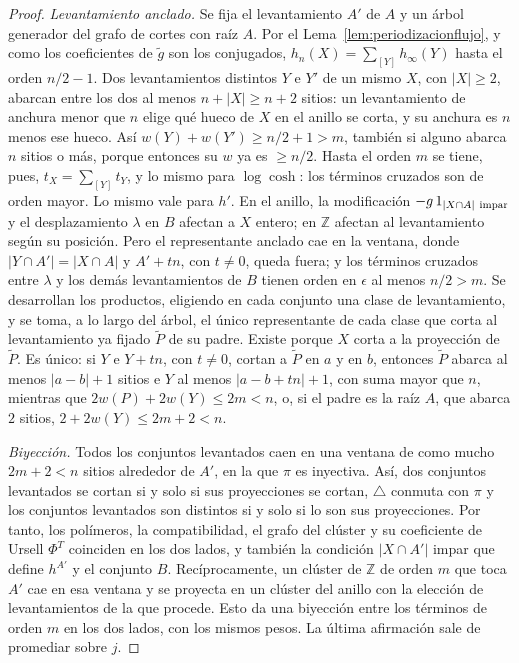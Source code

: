 \documentclass[11pt,a4paper]{article}
\theoremstyle{remark}
\begin{document}
\begin{proof}
\emph{Levantamiento anclado.} Se fija el levantamiento $A'$ de $A$ y un árbol generador del grafo de
cortes con raíz $A$. Por el Lema~\ref{lem:periodizacionflujo}, y como los coeficientes de $\tilde g$ son
los conjugados, $h_n(X)=\sum_{[Y]}h_\infty(Y)$ hasta el orden $n/2-1$. Dos levantamientos distintos $Y$ e
$Y'$ de un mismo $X$, con $|X|\ge2$, abarcan entre los dos al menos $n+|X|\ge n+2$ sitios: un levantamiento
de anchura menor que $n$ elige qué hueco de $X$ en el anillo se corta, y su anchura es $n$ menos ese hueco.
Así $w(Y)+w(Y')\ge n/2+1>m$, también si alguno abarca $n$ sitios o más, porque entonces su $w$ ya es
$\ge n/2$. Hasta el orden $m$ se tiene, pues, $t_X=\sum_{[Y]}t_Y$, y lo mismo para $\log\cosh$: los
términos cruzados son de orden mayor. Lo mismo vale para $h'$. En el anillo, la modificación
$-g\,1_{|X\cap A|\ \rm impar}$ y el desplazamiento $\lambda$ en $B$ afectan a $X$ entero; en $\mathbb Z$ afectan al
levantamiento según su posición. Pero el representante anclado cae en la ventana, donde
$|Y\cap A'|=|X\cap A|$ y $A'+tn$, con $t\ne0$, queda fuera; y los términos cruzados entre $\lambda$ y los demás
levantamientos de $B$ tienen orden en $\epsilon$ al menos $n/2>m$. Se desarrollan los productos, eligiendo en cada
conjunto una clase de levantamiento, y se toma, a lo largo del árbol, el único representante de cada
clase que corta al levantamiento ya fijado $\tilde P$ de su padre. Existe porque $X$ corta a la proyección
de $\tilde P$. Es único: si $Y$ e $Y+tn$, con $t\ne0$, cortan a $\tilde P$ en $a$ y en $b$, entonces $\tilde P$
abarca al menos $|a-b|+1$ sitios e $Y$ al menos $|a-b+tn|+1$, con suma mayor que $n$, mientras que
$2w(P)+2w(Y)\le2m<n$, o, si el padre es la raíz $A$, que abarca $2$ sitios, $2+2w(Y)\le2m+2<n$.

\emph{Biyección.} Todos los conjuntos levantados caen en una ventana de como mucho $2m+2<n$ sitios
alrededor de $A'$, en la que $\pi$ es inyectiva. Así, dos conjuntos levantados se cortan si y solo si sus
proyecciones se cortan, $\triangle$ conmuta con $\pi$ y los conjuntos levantados son distintos si y solo si lo
son sus proyecciones. Por tanto, los polímeros, la compatibilidad, el grafo del clúster y su
coeficiente de Ursell $\Phi^T$ coinciden en los dos lados, y también la condición $|X\cap A'|$ impar
que define $h^{A'}$ y el conjunto $B$. Recíprocamente, un clúster de $\mathbb Z$ de orden $m$ que toca $A'$
cae en esa ventana y se proyecta en un clúster del anillo con la elección de levantamientos de la que
procede. Esto da una biyección entre los términos de orden $m$ en los dos lados, con los mismos
pesos. La última afirmación sale de promediar sobre $j$.
\end{proof}
\end{document}
